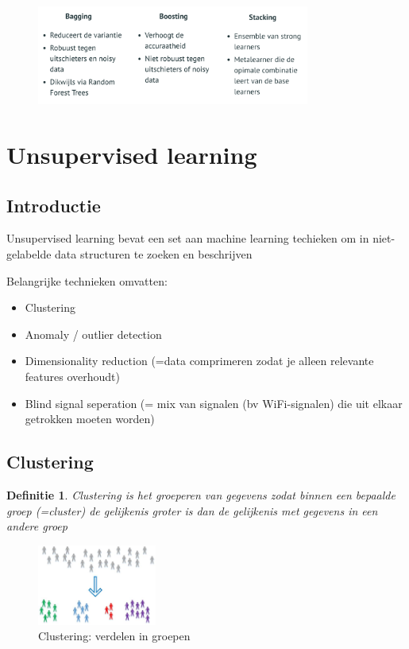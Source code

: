\documentclass{article}
\newtheorem{theorem}{Definitie}[section]
\begin{document}
\begin{figure}[H]
    \centering
    \includegraphics[width=0.8\textwidth]{ensemble-learning-overzicht.png}
\end{figure}

\section{Unsupervised learning}

\subsection{Introductie}

Unsupervised learning bevat een set aan machine learning techieken om in
niet-gelabelde data structuren te zoeken en beschrijven

Belangrijke technieken omvatten:

\begin{itemize}
    \item Clustering
    \item Anomaly / outlier detection
    \item Dimensionality reduction (=data comprimeren zodat je alleen relevante features overhoudt)
    \item Blind signal seperation (= mix van signalen (bv WiFi-signalen) die uit elkaar getrokken moeten worden)
\end{itemize}

\subsection{Clustering}

\begin{theorem}
    Clustering is het groeperen van gegevens zodat binnen een bepaalde groep (=cluster) 
    de gelijkenis groter is dan de gelijkenis met gegevens in een andere groep
\end{theorem}

\begin{figure}[H]
    \centering
    \includegraphics[width=0.35\textwidth]{clustering.png}
    \caption{Clustering: verdelen in groepen}
\end{figure}
\end{document}
